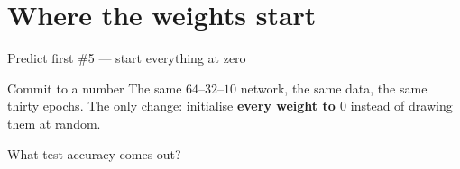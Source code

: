 \documentclass[aspectratio=169]{beamer}
\begin{document}
\section[Initialisation]{Where the weights start}
\label{sec:init}

\begin{frame}{Predict first \#5 --- start everything at zero}
  \begin{alertblock}{Commit to a number}
    The same $64$--$32$--$10$ network, the same data, the same thirty epochs.
    The only change: initialise \textbf{every weight to $0$} instead of
    drawing them at random.

    \medskip
    \centering\large
    What test accuracy comes out?
  \end{alertblock}
\end{frame}
\end{document}
